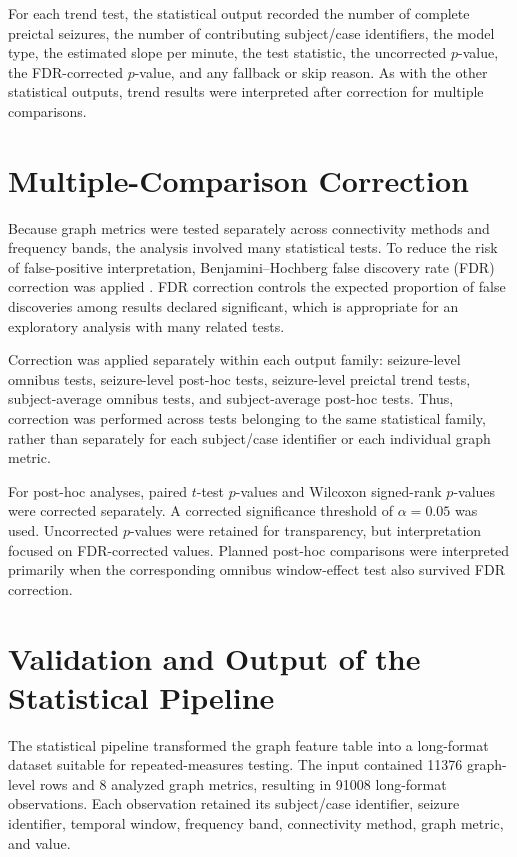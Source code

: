 For each trend test, the statistical output recorded the number of complete
preictal seizures, the number of contributing subject/case identifiers, the
model type, the estimated slope per minute, the test statistic, the
uncorrected $p$-value, the FDR-corrected $p$-value, and any fallback or skip
reason. As with the other statistical outputs, trend results were interpreted
after correction for multiple comparisons.

\section{Multiple-Comparison Correction}
\label{sec:multiple-comparison-correction}

Because graph metrics were tested separately across connectivity methods and
frequency bands, the analysis involved many statistical tests. To reduce the
risk of false-positive interpretation, Benjamini--Hochberg false discovery rate
(FDR) correction was applied \cite{Benjamini1995}. FDR correction controls the
expected proportion of false discoveries among results declared significant,
which is appropriate for an exploratory analysis with many related tests.

Correction was applied separately within each output family: seizure-level
omnibus tests, seizure-level post-hoc tests, seizure-level preictal trend
tests, subject-average omnibus tests, and subject-average post-hoc tests. Thus,
correction was performed across tests belonging to the same statistical family,
rather than separately for each subject/case identifier or each individual graph
metric.

For post-hoc analyses, paired $t$-test $p$-values and Wilcoxon signed-rank
$p$-values were corrected separately. A corrected significance threshold of
$\alpha = 0.05$ was used. Uncorrected $p$-values were retained for
transparency, but interpretation focused on FDR-corrected values. Planned
post-hoc comparisons were interpreted primarily when the corresponding omnibus
window-effect test also survived FDR correction.

\section{Validation and Output of the Statistical Pipeline}
\label{sec:statistical-pipeline-validation-output}

The statistical pipeline transformed the graph feature table into a long-format
dataset suitable for repeated-measures testing. The input contained
\num{11376} graph-level rows and \num{8} analyzed graph metrics, resulting in
\num{91008} long-format observations. Each observation retained its
subject/case identifier, seizure identifier, temporal window, frequency band,
connectivity method, graph metric, and value.

